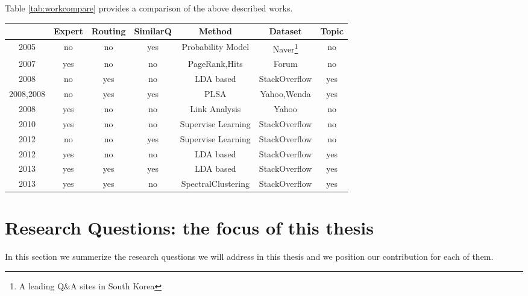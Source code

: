 Table \ref{tab:workcompare} provides a comparison of the above described works.

\begin{sidewaystable}%
\centering
\begin{tabular}{|c|c|c|c|c|c|c|}
\hline
&Expert & Routing &SimilarQ& Method & Dataset &Topic   \\
\hline
\cite{chp2jeon2005finding} 2005&no&no&yes&Probability Model&Naver\footnote{A leading Q\&A sites in South Korea} & no \\
\hline
 \cite{zhang2007expertise} 2007& yes &no& no& PageRank,Hits&Forum&no  \\
\hline
\cite{Guo:2008:TPQ:1458082.1458204} 2008 & no&yes&no&LDA based&StackOverflow&yes\\
\hline
\cite{chp2Qu:2009:WWW:PLSA:SimlarQ} 2008,\cite{chp2Wu:2008:PLSA:SimlarQ}2008  & no&yes&yes&PLSA&Yahoo,Wenda & yes \\
\hline
\cite{chp2Bouguessa:2008:Identify:authority:indegree} 2008 & yes&no&no&Link Analysis&Yahoo&no\\
\hline
\cite{chp2Pal:2010:Expert:evolution} 2010&yes&no&no&Supervise Learning&StackOverflow&no \\
\hline
\cite{anderson2012discovering} 2012& no&no&yes&Supervise Learning&StackOverflow&no \\
\hline
\cite{chp2Zhou:2012:TPM:2396761.2398493} 2012 & yes & no & no&LDA based &StackOverflow&yes\\
\hline
\cite{yang2013cqarank} 2013& yes&yes&yes& LDA based&StackOverflow&yes   \\
\hline
\cite{Chang:2013}2013 & yes&yes&no& SpectralClustering&StackOverflow&yes  \\
\hline
\end{tabular}
\caption{Comparison of several works in Q\&A sites. 'Expert' denotes 'Expert detection', 'Routing' denotes 'Question Routing', 'Similar' denotes 'Similar Question Finding', 'Method' denotes 'Proposed algorithm', 'Dataset' denotes 'Experiment Data', and 'Topic' denotes 'Topic Detection'}
\label{tab:workcompare}
\end{sidewaystable}



\section{Research Questions: the focus of this thesis}
In this section we summerize the research questions we will address in this thesis and we position our contribution for each of them. 

